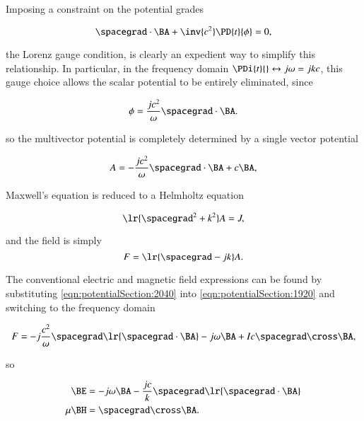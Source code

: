 Imposing a constraint on the potential grades

\begin{dmath}\label{eqn:potentialSection:2020}
\spacegrad \cdot \BA + \inv{c^2} \PD{t}{\phi} = 0,
\end{dmath}

the Lorenz gauge condition, is clearly an expedient way to simplify this relationship.
In particular,
in the frequency domain \( \PDi{t}{} \leftrightarrow j \omega = j k c \), this gauge choice allows the scalar potential to be entirely eliminated, since

\begin{dmath}\label{eqn:potentialSection:2040}
\phi = \frac{j c^2}{\omega} \spacegrad \cdot \BA.
\end{dmath}

so the multivector potential is completely determined by a single vector potential

\begin{dmath}\label{eqn:potentialSection:2060}
A =
-\frac{j c^2}{\omega} \spacegrad \cdot \BA + c \BA,
\end{dmath}

Maxwell's equation is reduced to a Helmholtz equation

\begin{dmath}\label{eqn:potentialSection:2080}
\lr{ \spacegrad^2 + k^2} A = J,
\end{dmath}

and the field is simply
\begin{dmath}\label{eqn:potentialSection:2100}
F = \lr{ \spacegrad - j k } A.
\end{dmath}

The conventional electric and magnetic field expressions can be found by substituting \cref{eqn:potentialSection:2040} into
\cref{eqn:potentialSection:1920} and switching to the frequency domain

\begin{dmath}\label{eqn:potentialSection:2380}
F
=
-j \frac{c^2}{\omega} \spacegrad \lr{ \spacegrad \cdot \BA }
-j \omega \BA
+ I c \spacegrad \cross \BA,
\end{dmath}

%
%

so

\begin{dmath}\label{eqn:potentialSection:2320}
\begin{aligned}
\BE &= -j \omega \BA -\frac{j c}{k} \spacegrad \lr{ \spacegrad \cdot \BA } \\
\mu \BH &= \spacegrad \cross \BA.
\end{aligned}
\end{dmath}

